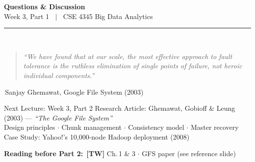 \documentclass[aspectratio=169,10pt]{beamer}
\begin{document}
\begin{frame}[c]
  \begin{center}
    {\Large\bfseries Questions \& Discussion}\\[10pt]
    {\large Week 3, Part 1 $\;\mid\;$ CSE 4345 Big Data Analytics}\\[8pt]
    \textcolor{PUGray}{\rule{7cm}{0.5pt}}\\[10pt]
    \begin{quote}
      \itshape ``We have found that at our scale, the most effective approach to fault tolerance
                 is the ruthless elimination of single points of failure, not heroic individual components.''
    \end{quote}
    \hfill\textemdash\,Sanjay Ghemawat, Google File System (2003)
    \vspace{14pt}
    \begin{block}{\centering Next Lecture: Week 3, Part 2}
      \centering
      Research Article: Ghemawat, Gobioff \& Leung (2003) — \textit{``The Google File System''}\\[4pt]
      \small Design principles $\cdot$ Chunk management $\cdot$ Consistency model $\cdot$ Master recovery\\
      Case Study: Yahoo!'s 10{,}000-node Hadoop deployment (2008)
    \end{block}
    \vspace{6pt}
    \textbf{Reading before Part 2:}\ \textbf{[TW]} Ch.\,1 \& 3 $\cdot$ GFS paper (see reference slide)
  \end{center}
\end{frame}

\end{document}
